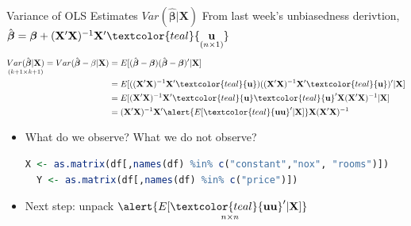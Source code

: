 \documentclass[11pt, aspectratio = 169]{beamer}
\begin{document}
\begin{frame}[fragile]{Variance of OLS Estimates $Var(\hat{\boldsymbol{\beta}}|\mathbf{X})$}
  From last week's unbiasedness derivtion, 
  $
  \hat{\boldsymbol{\beta}} = \boldsymbol{\beta} + (\mathbf{X}'\mathbf{X})^{-1}\mathbf{X}' \textcolor{teal}{\underset{(n \times 1)}{\mathbf{u}}}
  $
\pause
\begin{align*}
\underset{(k+1 \times k+1)}{Var(\hat{\boldsymbol{\beta}}|\mathbf{X})} = Var(\hat{\boldsymbol{\beta}}-\beta|\mathbf{X}) &= E[(\hat{\boldsymbol{\beta}}-\boldsymbol{\beta})(\hat{\boldsymbol{\beta}}-\boldsymbol{\beta})'|\mathbf{X}]\\
                            &= E[((\mathbf{X}'\mathbf{X})^{-1}\mathbf{X}'\textcolor{teal}{\mathbf{u}})((\mathbf{X}'\mathbf{X})^{-1}\mathbf{X}'\textcolor{teal}{\mathbf{u}})'|\mathbf{X}]\\
                            &= E[(\mathbf{X}'\mathbf{X})^{-1}\mathbf{X}'\textcolor{teal}{\mathbf{u}}\textcolor{teal}{\mathbf{u}}'\mathbf{X}(\mathbf{X}'\mathbf{X})^{-1}|\mathbf{X}]\\
                            &= (\mathbf{X}'\mathbf{X})^{-1}\mathbf{X}'\alert{E[\textcolor{teal}{\mathbf{u}\mathbf{u}}'|\mathbf{X}]}\mathbf{X}(\mathbf{X}'\mathbf{X})^{-1}\\
\end{align*}
\pause
\vspace{-1cm}
\begin{itemize}
  \item What do we observe? What we do not observe?
  \pause
\begin{lstlisting}[language=R]      
  X <- as.matrix(df[,names(df) %in% c("constant","nox", "rooms")])
  Y <- as.matrix(df[,names(df) %in% c("price")])
\end{lstlisting}   
  \pause
  \item Next step: unpack 
  $\alert{\underset{n \times n}{E[\textcolor{teal}{\mathbf{u}\mathbf{u}}'|\mathbf{X}]}}$
\end{itemize}
\end{frame}
\end{document}
